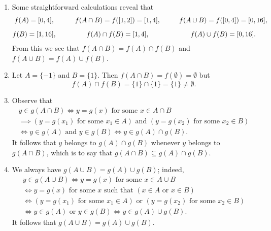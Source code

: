\documentclass{lew98_solutions}
\begin{document}
\begin{solution}
    \begin{enumerate}
        \item Some straightforward calculations reveal that
        \[
            \begin{gathered}
                f(A) = [0, 4], \\[2mm]
                f(B) = [1, 16],
            \end{gathered}
            \hspace{10mm}
            \begin{gathered}
                f(A \cap B) = f([1, 2]) = [1, 4], \\[2mm]
                f(A) \cap f(B) = [1, 4],
            \end{gathered}
            \hspace{10mm}
            \begin{gathered}
                f(A \cup B) = f([0, 4]) = [0, 16], \\[2mm]
                f(A) \cup f(B) = [0, 16].
            \end{gathered}
        \]
        From this we see that \( f(A \cap B) = f(A) \cap f(B) \) and \( f(A \cup B) = f(A) \cup f(B) \).
    
        \item Let \( A = \{ -1 \} \) and \( B = \{ 1 \} \). Then \( f(A \cap B) = f(\emptyset) = \emptyset \) but
        \[
            f(A) \cap f(B) = \{ 1 \} \cap \{ 1 \} = \{ 1 \} \neq \emptyset.
        \]

        \item Observe that
        \begin{gather*}
            y \in g(A \cap B) \iff y = g(x) \text{ for some } x \in A \cap B \\[2mm]
            \implies (y = g(x_1) \text{ for some } x_1 \in A) \text{ and } (y = g(x_2) \text{ for some } x_2 \in B) \\[2mm]
            \iff y \in g(A) \text{ and } y \in g(B) \iff y \in g(A) \cap g(B).
        \end{gather*}
        It follows that \( y \) belongs to \( g(A) \cap g(B) \) whenever \( y \) belongs to \( g(A \cap B) \), which is to say that \( g(A \cap B) \subseteq g(A) \cap g(B) \).

        \item We always have \( g(A \cup B) = g(A) \cup g(B) \); indeed,
        \begin{gather*}
            y \in g(A \cup B) \iff y = g(x) \text{ for some } x \in A \cup B \\[2mm]
            \iff y = g(x) \text{ for some } x \text{ such that } (x \in A \text{ or } x \in B) \\[2mm]
            \iff (y = g(x_1) \text{ for some } x_1 \in A) \text{ or } (y = g(x_2) \text{ for some } x_2 \in B) \\[2mm]
            \iff y \in g(A) \text{ or } y \in g(B) \iff y \in g(A) \cup g(B).
        \end{gather*}
        It follows that \( g(A \cup B) = g(A) \cup g(B) \).
    \end{enumerate}
\end{solution}
\end{document}
